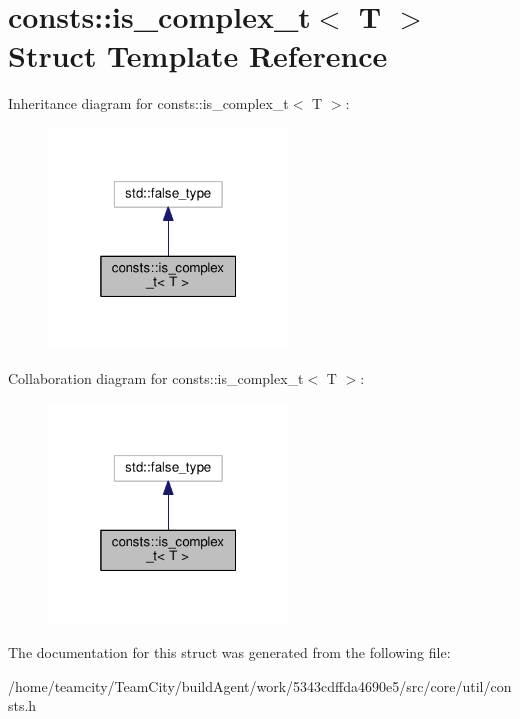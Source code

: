 \hypertarget{structconsts_1_1is__complex__t}{}\section{consts\+:\+:is\+\_\+complex\+\_\+t$<$ T $>$ Struct Template Reference}
\label{structconsts_1_1is__complex__t}


Inheritance diagram for consts\+:\+:is\+\_\+complex\+\_\+t$<$ T $>$\+:
\nopagebreak
\begin{figure}[H]
\begin{center}
\leavevmode
\includegraphics[width=181pt]{structconsts_1_1is__complex__t__inherit__graph}
\end{center}
\end{figure}


Collaboration diagram for consts\+:\+:is\+\_\+complex\+\_\+t$<$ T $>$\+:
\nopagebreak
\begin{figure}[H]
\begin{center}
\leavevmode
\includegraphics[width=181pt]{structconsts_1_1is__complex__t__coll__graph}
\end{center}
\end{figure}


The documentation for this struct was generated from the following file\+:\begin{DoxyCompactItemize}
\item 
/home/teamcity/\+Team\+City/build\+Agent/work/5343cdffda4690e5/src/core/util/consts.\+h\end{DoxyCompactItemize}
